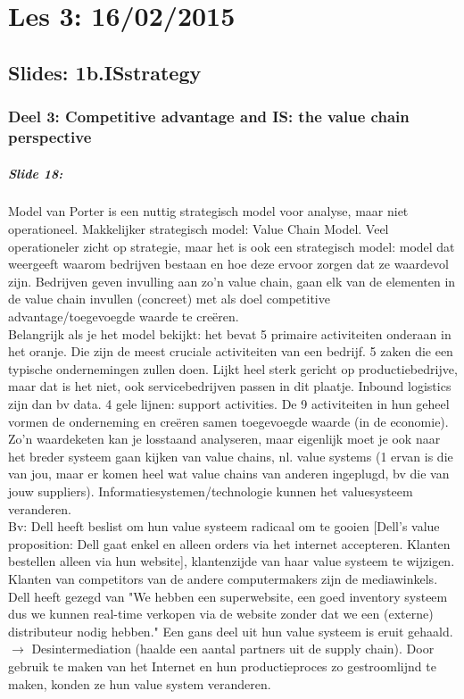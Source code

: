 \documentclass[10pt,a4paper]{report}
\begin{document}
\chapter{Les 3: 16/02/2015}
\section{Slides: 1b.ISstrategy}
\subsection{Deel 3: Competitive advantage and IS: the value chain perspective}
\paragraph{Slide 18:}Model van Porter is een nuttig strategisch model voor analyse, maar niet operationeel. Makkelijker strategisch model: Value Chain Model. 
Veel operationeler zicht op strategie, maar het is ook een strategisch model: model dat weergeeft waarom bedrijven bestaan en hoe deze ervoor zorgen dat ze waardevol zijn. 
Bedrijven geven invulling aan zo'n value chain, gaan elk van de elementen in de value chain invullen (concreet) met als doel competitive advantage/toegevoegde waarde te creëren.\\
Belangrijk als je het model bekijkt: het bevat 5 primaire activiteiten onderaan in het oranje. 
Die zijn de meest cruciale activiteiten van een bedrijf. 5 zaken die een typische ondernemingen zullen doen. 
Lijkt heel sterk gericht op productiebedrijve, maar dat is het niet, ook servicebedrijven passen in dit plaatje. 
Inbound logistics zijn dan bv data. 4 gele lijnen: support activities. De 9 activiteiten in hun geheel vormen de onderneming en creëren samen toegevoegde waarde (in de economie).\\
Zo'n waardeketen kan je losstaand analyseren, maar eigenlijk moet je ook naar het breder systeem gaan kijken van value chains, nl. value systems (1 ervan is die van jou, maar er komen heel wat value chains van anderen ingeplugd, bv die van jouw suppliers). Informatiesystemen/technologie kunnen het valuesysteem veranderen. \\
Bv: Dell heeft beslist om hun value systeem radicaal om te gooien [Dell's value proposition: Dell gaat enkel en alleen orders via het internet accepteren. Klanten bestellen alleen via hun website], klantenzijde van haar value systeem te wijzigen. Klanten van competitors van de andere computermakers zijn de mediawinkels. Dell heeft gezegd van "We hebben een superwebsite, een goed inventory systeem dus we kunnen real-time verkopen via de website zonder dat we een (externe) distributeur nodig hebben." Een gans deel uit hun value systeem is eruit gehaald. $\rightarrow$ Desintermediation (haalde een aantal partners uit de supply chain). Door gebruik te maken van het Internet en hun productieproces zo gestroomlijnd te maken, konden ze hun value system veranderen.
\end{document}
